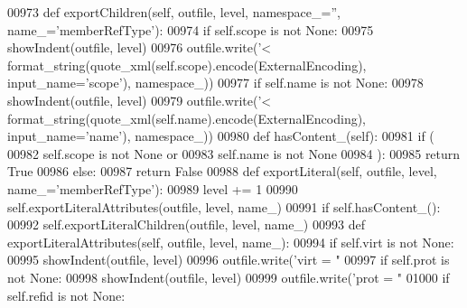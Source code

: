 \begin{DoxyCode}
{{{{{{{{{{{{{{{{{{{{{{{{{{{{{{{{{{{{{{{{{{{00973     \textcolor{keyword}{def }exportChildren(self, outfile, level, namespace\_='', name\_='memberRefType'):
00974         \textcolor{keywordflow}{if} self.scope \textcolor{keywordflow}{is} \textcolor{keywordflow}{not} \textcolor{keywordtype}{None}:
00975             showIndent(outfile, level)
00976             outfile.write(\textcolor{stringliteral}{'<%
      format_string(quote_xml(self.scope).encode(ExternalEncoding), input\_name=\textcolor{stringliteral}{'scope'}), namespace\_))
00977         \textcolor{keywordflow}{if} self.name \textcolor{keywordflow}{is} \textcolor{keywordflow}{not} \textcolor{keywordtype}{None}:
00978             showIndent(outfile, level)
00979             outfile.write(\textcolor{stringliteral}{'<%
      format_string(quote_xml(self.name).encode(ExternalEncoding), input\_name=\textcolor{stringliteral}{'name'}), namespace\_))
00980     \textcolor{keyword}{def }hasContent_(self):
00981         \textcolor{keywordflow}{if} (
00982             self.scope \textcolor{keywordflow}{is} \textcolor{keywordflow}{not} \textcolor{keywordtype}{None} \textcolor{keywordflow}{or}
00983             self.name \textcolor{keywordflow}{is} \textcolor{keywordflow}{not} \textcolor{keywordtype}{None}
00984             ):
00985             \textcolor{keywordflow}{return} \textcolor{keyword}{True}
00986         \textcolor{keywordflow}{else}:
00987             \textcolor{keywordflow}{return} \textcolor{keyword}{False}
00988     \textcolor{keyword}{def }exportLiteral(self, outfile, level, name\_='memberRefType'):
00989         level += 1
00990         self.exportLiteralAttributes(outfile, level, name\_)
00991         \textcolor{keywordflow}{if} self.hasContent_():
00992             self.exportLiteralChildren(outfile, level, name\_)
00993     \textcolor{keyword}{def }exportLiteralAttributes(self, outfile, level, name\_):
00994         \textcolor{keywordflow}{if} self.virt \textcolor{keywordflow}{is} \textcolor{keywordflow}{not} \textcolor{keywordtype}{None}:
00995             showIndent(outfile, level)
00996             outfile.write(\textcolor{stringliteral}{'virt = "%
00997         \textcolor{keywordflow}{if} self.prot \textcolor{keywordflow}{is} \textcolor{keywordflow}{not} \textcolor{keywordtype}{None}:
00998             showIndent(outfile, level)
00999             outfile.write(\textcolor{stringliteral}{'prot = "%
01000         \textcolor{keywordflow}{if} self.refid \textcolor{keywordflow}{is} \textcolor{keywordflow}{not} \textcolor{keywordtype}{None}:
}}}}}}}}}}}}}}}}}}}}}}}}}}}}}}}}}}}}}}}}}}}}}}}
\end{DoxyCode}
